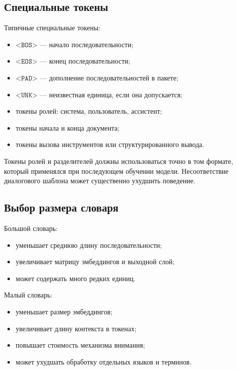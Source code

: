 \documentclass[12pt,a4paper]{article}
\newcommand{\1}{\mathbf{1}}
\theoremstyle{definition}
\theoremstyle{remark}
\begin{document}
\subsection{Специальные токены}

Типичные специальные токены:

\begin{itemize}
    \item $\texttt{<BOS>}$ --- начало последовательности;
    \item $\texttt{<EOS>}$ --- конец последовательности;
    \item $\texttt{<PAD>}$ --- дополнение последовательностей в пакете;
    \item $\texttt{<UNK>}$ --- неизвестная единица, если она допускается;
    \item токены ролей: система, пользователь, ассистент;
    \item токены начала и конца документа;
    \item токены вызова инструментов или структурированного вывода.
\end{itemize}

Токены ролей и разделителей должны использоваться точно в том формате,
который применялся при последующем обучении модели. Несоответствие
диалогового шаблона может существенно ухудшить поведение.

\subsection{Выбор размера словаря}

Большой словарь:

\begin{itemize}
    \item уменьшает среднюю длину последовательности;
    \item увеличивает матрицу эмбеддингов и выходной слой;
    \item может содержать много редких единиц.
\end{itemize}

Малый словарь:

\begin{itemize}
    \item уменьшает размер эмбеддингов;
    \item увеличивает длину контекста в токенах;
    \item повышает стоимость механизма внимания;
    \item может ухудшать обработку отдельных языков и терминов.
\end{itemize}
\end{document}

